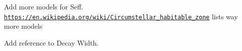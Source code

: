 
\begin{DoxyRefList}
\item[\label{todo__todo000001}%
\Hypertarget{todo__todo000001}%
File \hyperlink{_circumstellar_habitable_zone_8hpp}{Circumstellar\+Habitable\+Zone.hpp} ]Add more models for Seff. \href{https://en.wikipedia.org/wiki/Circumstellar_habitable_zone}{\tt https\+://en.\+wikipedia.\+org/wiki/\+Circumstellar\+\_\+habitable\+\_\+zone} lists way more models  
\item[\label{todo__todo000002}%
\Hypertarget{todo__todo000002}%
File \hyperlink{_half_life_8hpp}{Half\+Life.hpp} ]Add reference to Decay Width. 
\end{DoxyRefList}